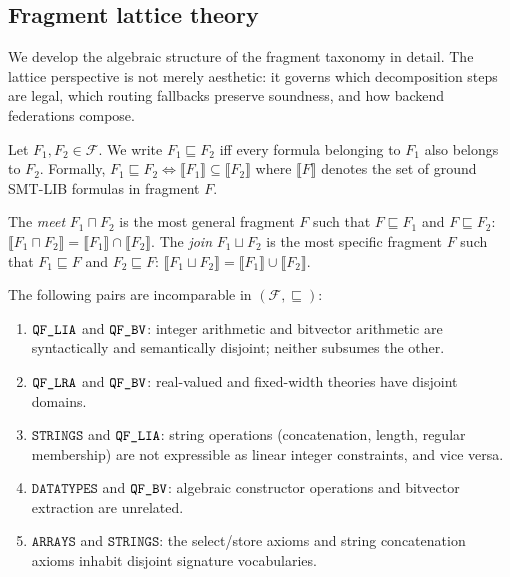 \documentclass[11pt]{article}
\begin{document}
\subsection{Fragment lattice theory}\label{sec:lattice-theory}

We develop the algebraic structure of the fragment taxonomy in
detail.  The lattice perspective is not merely aesthetic: it
governs which decomposition steps are legal, which routing
fallbacks preserve soundness, and how backend federations compose.

\begin{definition}\label{def:frag-order}
Let $F_1, F_2 \in \mathcal{F}$.  We write $F_1 \sqsubseteq F_2$
iff every formula belonging to $F_1$ also belongs to $F_2$.
Formally, $F_1 \sqsubseteq F_2 \iff \llbracket F_1 \rrbracket
\subseteq \llbracket F_2 \rrbracket$ where
$\llbracket F \rrbracket$ denotes the set of ground SMT-LIB
formulas in fragment $F$.
\end{definition}

\begin{definition}\label{def:meet-join}
The \emph{meet} $F_1 \sqcap F_2$ is the most general fragment
$F$ such that $F \sqsubseteq F_1$ and $F \sqsubseteq F_2$:
$\llbracket F_1 \sqcap F_2 \rrbracket = \llbracket F_1 \rrbracket
\cap \llbracket F_2 \rrbracket$.
The \emph{join} $F_1 \sqcup F_2$ is the most specific fragment
$F$ such that $F_1 \sqsubseteq F$ and $F_2 \sqsubseteq F$:
$\llbracket F_1 \sqcup F_2 \rrbracket = \llbracket F_1 \rrbracket
\cup \llbracket F_2 \rrbracket$.
\end{definition}

\begin{proposition}\label{prop:incomparable}
The following pairs are incomparable in $(\mathcal{F}, \sqsubseteq)$:
\begin{enumerate}[nosep,label=(\alph*)]
  \item $\texttt{QF\_LIA}$ and $\texttt{QF\_BV}$: integer arithmetic and bitvector
    arithmetic are syntactically and semantically disjoint;
    neither subsumes the other.
  \item $\texttt{QF\_LRA}$ and $\texttt{QF\_BV}$: real-valued and fixed-width
    theories have disjoint domains.
  \item $\texttt{STRINGS}$ and $\texttt{QF\_LIA}$: string operations
    (concatenation, length, regular membership) are not
    expressible as linear integer constraints, and vice versa.
  \item $\texttt{DATATYPES}$ and $\texttt{QF\_BV}$: algebraic constructor
    operations and bitvector extraction are unrelated.
  \item $\texttt{ARRAYS}$ and $\texttt{STRINGS}$: the
    select/store axioms and string concatenation axioms
    inhabit disjoint signature vocabularies.
\end{enumerate}
\end{proposition}
\end{document}
